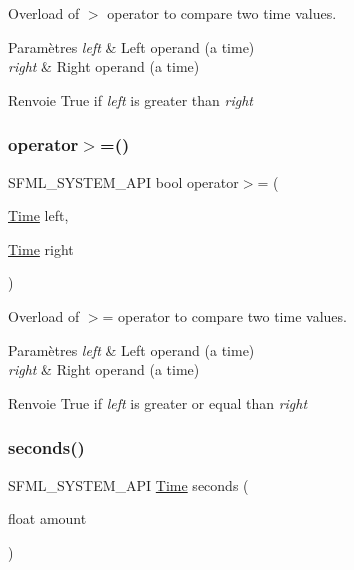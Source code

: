Overload of $>$ operator to compare two time values. 


\begin{DoxyParams}{Paramètres}
{\em left} & Left operand (a time) \\
\hline
{\em right} & Right operand (a time)\\
\hline
\end{DoxyParams}
\begin{DoxyReturn}{Renvoie}
True if {\itshape left} is greater than {\itshape right} 
\end{DoxyReturn}
\mbox{\label{classsf_1_1Time_ad69edc80cd01b7a03f5673b4276181eb}} 
\subsubsection{\texorpdfstring{operator$>$=()}{operator>=()}}
{\footnotesize\ttfamily S\+F\+M\+L\+\_\+\+S\+Y\+S\+T\+E\+M\+\_\+\+A\+PI bool operator$>$= (\begin{DoxyParamCaption}\item[{\hyperlink{classsf_1_1Time}{Time}}]{left,  }\item[{\hyperlink{classsf_1_1Time}{Time}}]{right }\end{DoxyParamCaption})\hspace{0.3cm}{\ttfamily [related]}}



Overload of $>$= operator to compare two time values. 


\begin{DoxyParams}{Paramètres}
{\em left} & Left operand (a time) \\
\hline
{\em right} & Right operand (a time)\\
\hline
\end{DoxyParams}
\begin{DoxyReturn}{Renvoie}
True if {\itshape left} is greater or equal than {\itshape right} 
\end{DoxyReturn}
\mbox{\label{classsf_1_1Time_ae36b9ef700f0ed0516abf0194ceb546b}} 
\subsubsection{\texorpdfstring{seconds()}{seconds()}}
{\footnotesize\ttfamily S\+F\+M\+L\+\_\+\+S\+Y\+S\+T\+E\+M\+\_\+\+A\+PI \hyperlink{classsf_1_1Time}{Time} seconds (\begin{DoxyParamCaption}\item[{float}]{amount }\end{DoxyParamCaption})\hspace{0.3cm}{\ttfamily [related]}}




